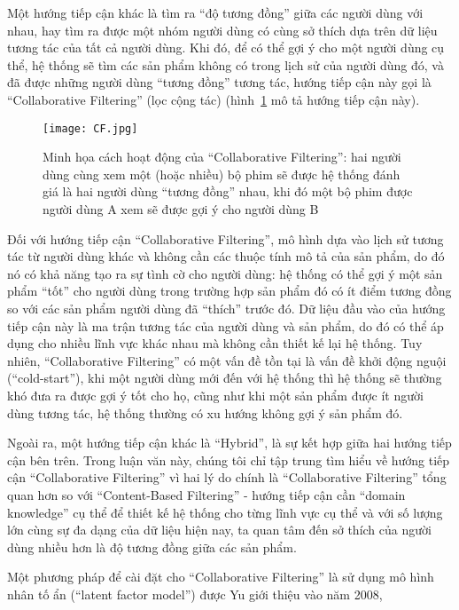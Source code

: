 Một hướng tiếp cận khác là tìm ra ``độ tương đồng'' giữa các người dùng với nhau, hay tìm ra được một nhóm người dùng
có cùng sở thích dựa trên dữ liệu tương tác của tất cả người dùng. Khi đó, để có thể gợi ý cho một người dùng cụ thể,
hệ thống sẽ tìm các sản phẩm không có trong lịch sử của người dùng đó, và đã được những người dùng ``tương đồng'' tương tác,
hướng tiếp cận này gọi là ``Collaborative Filtering'' (lọc cộng tác) (hình~\ref{fig_CF} mô tả hướng tiếp cận này).
\begin{figure}
    \centering
    \texttt{[image: CF.jpg]}
    \caption{Minh họa cách hoạt động của ``Collaborative Filtering'': hai người dùng cùng xem một (hoặc nhiều) bộ phim 
    sẽ được hệ thống đánh giá là hai người dùng ``tương đồng'' nhau, khi đó một bộ phim được
    người dùng A xem sẽ được gợi ý cho người dùng B}
    \label{fig_CF}
\end{figure}
Đối với hướng tiếp cận ``Collaborative Filtering'', mô hình dựa vào lịch sử tương tác từ người dùng khác
và không cần các thuộc tính mô tả của sản phẩm, do đó nó có khả năng tạo ra sự tình cờ cho người dùng:
hệ thống có thể gợi ý một sản phẩm ``tốt'' cho người dùng trong trường hợp sản phẩm đó có ít điểm tương đồng
so với các sản phẩm người dùng đã ``thích'' trước đó. Dữ liệu đầu vào của hướng tiếp cận này là ma trận tương tác
của người dùng và sản phẩm, do đó có thể áp dụng cho nhiều lĩnh vực khác nhau mà không cần thiết kế lại hệ thống.
Tuy nhiên, ``Collaborative Filtering'' có một vấn đề tồn tại là vấn đề khởi động nguội (``cold-start''),
khi một người dùng mới đến với hệ thống thì hệ thống sẽ thường khó đưa ra được gợi ý tốt cho họ,
cũng như khi một sản phẩm được ít người dùng tương tác, hệ thống thường có xu hướng không gợi ý sản phẩm đó.

Ngoài ra, một hướng tiếp cận khác là ``Hybrid'', là sự kết hợp giữa hai hướng tiếp cận bên trên.
Trong luận văn này, chúng tôi chỉ tập trung tìm hiểu về hướng tiếp cận ``Collaborative Filtering''
vì hai lý do chính là ``Collaborative Filtering'' tổng quan hơn so với ``Content-Based Filtering''
- hướng tiếp cận cần ``domain knowledge'' cụ thể để thiết kế hệ thống cho từng lĩnh vực cụ thể
và với số lượng lớn cùng sự đa dạng của dữ liệu hiện nay,
ta quan tâm đến sở thích của người dùng nhiều hơn là độ tương đồng giữa các sản phẩm.

Một phương pháp để cài đặt cho ``Collaborative Filtering'' là sử dụng 
mô hình nhân tố ẩn (``latent factor model'') được Yu giới thiệu vào năm 2008, 








